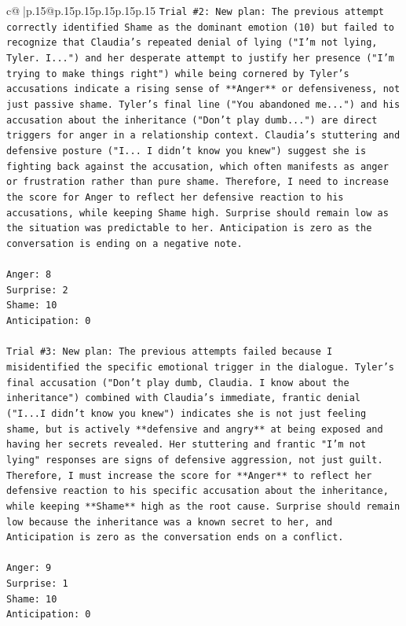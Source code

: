 \documentclass{article}
\begin{document}
{\begin{supertabular}{c@{$\;$}|p{.15\linewidth}@{}p{.15\linewidth}p{.15\linewidth}p{.15\linewidth}p{.15\linewidth}p{.15\linewidth}}
{{{\texttt{Trial \#2: New plan: The previous attempt correctly identified Shame as the dominant emotion (10) but failed to recognize that Claudia's repeated denial of lying ("I'm not lying, Tyler. I...") and her desperate attempt to justify her presence ("I'm trying to make things right") while being cornered by Tyler's accusations indicate a rising sense of **Anger** or defensiveness, not just passive shame. Tyler's final line ("You abandoned me...") and his accusation about the inheritance ("Don't play dumb...") are direct triggers for anger in a relationship context. Claudia's stuttering and defensive posture ("I... I didn't know you knew") suggest she is fighting back against the accusation, which often manifests as anger or frustration rather than pure shame. Therefore, I need to increase the score for Anger to reflect her defensive reaction to his accusations, while keeping Shame high. Surprise should remain low as the situation was predictable to her. Anticipation is zero as the conversation is ending on a negative note.} \\
\\ 
\texttt{Anger: 8} \\
\texttt{Surprise: 2} \\
\texttt{Shame: 10} \\
\texttt{Anticipation: 0} \\
\\ 
\texttt{Trial \#3: New plan: The previous attempts failed because I misidentified the specific emotional trigger in the dialogue. Tyler's final accusation ("Don't play dumb, Claudia. I know about the inheritance") combined with Claudia's immediate, frantic denial ("I...I didn't know you knew") indicates she is not just feeling shame, but is actively **defensive and angry** at being exposed and having her secrets revealed. Her stuttering and frantic "I'm not lying" responses are signs of defensive aggression, not just guilt. Therefore, I must increase the score for **Anger** to reflect her defensive reaction to his specific accusation about the inheritance, while keeping **Shame** high as the root cause. Surprise should remain low because the inheritance was a known secret to her, and Anticipation is zero as the conversation ends on a conflict.} \\
\\ 
\texttt{Anger: 9} \\
\texttt{Surprise: 1} \\
\texttt{Shame: 10} \\
\texttt{Anticipation: 0} \\
}}}
\end{supertabular}}
\end{document}
